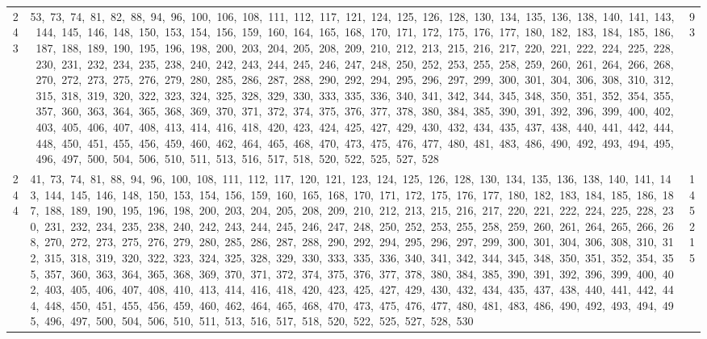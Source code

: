 \begin{longtable}{c|p{}|r}
243 & 53,\ 73,\ 74,\ 81,\ 82,\ 88,\ 94,\ 96,\ 100,\ 106,\ 108,\ 111,\ 112,\ 117,\ 121,\ 124,\ 125,\ 126,\ 128,\ 130,\ 134,\ 135,\ 136,\ 138,\ 140,\ 141,\ 143,\ 144,\ 145,\ 146,\ 148,\ 150,\ 153,\ 154,\ 156,\ 159,\ 160,\ 164,\ 165,\ 168,\ 170,\ 171,\ 172,\ 175,\ 176,\ 177,\ 180,\ 182,\ 183,\ 184,\ 185,\ 186,\ 187,\ 188,\ 189,\ 190,\ 195,\ 196,\ 198,\ 200,\ 203,\ 204,\ 205,\ 208,\ 209,\ 210,\ 212,\ 213,\ 215,\ 216,\ 217,\ 220,\ 221,\ 222,\ 224,\ 225,\ 228,\ 230,\ 231,\ 232,\ 234,\ 235,\ 238,\ 240,\ 242,\ 243,\ 244,\ 245,\ 246,\ 247,\ 248,\ 250,\ 252,\ 253,\ 255,\ 258,\ 259,\ 260,\ 261,\ 264,\ 266,\ 268,\ 270,\ 272,\ 273,\ 275,\ 276,\ 279,\ 280,\ 285,\ 286,\ 287,\ 288,\ 290,\ 292,\ 294,\ 295,\ 296,\ 297,\ 299,\ 300,\ 301,\ 304,\ 306,\ 308,\ 310,\ 312,\ 315,\ 318,\ 319,\ 320,\ 322,\ 323,\ 324,\ 325,\ 328,\ 329,\ 330,\ 333,\ 335,\ 336,\ 340,\ 341,\ 342,\ 344,\ 345,\ 348,\ 350,\ 351,\ 352,\ 354,\ 355,\ 357,\ 360,\ 363,\ 364,\ 365,\ 368,\ 369,\ 370,\ 371,\ 372,\ 374,\ 375,\ 376,\ 377,\ 378,\ 380,\ 384,\ 385,\ 390,\ 391,\ 392,\ 396,\ 399,\ 400,\ 402,\ 403,\ 405,\ 406,\ 407,\ 408,\ 413,\ 414,\ 416,\ 418,\ 420,\ 423,\ 424,\ 425,\ 427,\ 429,\ 430,\ 432,\ 434,\ 435,\ 437,\ 438,\ 440,\ 441,\ 442,\ 444,\ 448,\ 450,\ 451,\ 455,\ 456,\ 459,\ 460,\ 462,\ 464,\ 465,\ 468,\ 470,\ 473,\ 475,\ 476,\ 477,\ 480,\ 481,\ 483,\ 486,\ 490,\ 492,\ 493,\ 494,\ 495,\ 496,\ 497,\ 500,\ 504,\ 506,\ 510,\ 511,\ 513,\ 516,\ 517,\ 518,\ 520,\ 522,\ 525,\ 527,\ 528 & 93 \\
244 & 41,\ 73,\ 74,\ 81,\ 88,\ 94,\ 96,\ 100,\ 108,\ 111,\ 112,\ 117,\ 120,\ 121,\ 123,\ 124,\ 125,\ 126,\ 128,\ 130,\ 134,\ 135,\ 136,\ 138,\ 140,\ 141,\ 143,\ 144,\ 145,\ 146,\ 148,\ 150,\ 153,\ 154,\ 156,\ 159,\ 160,\ 165,\ 168,\ 170,\ 171,\ 172,\ 175,\ 176,\ 177,\ 180,\ 182,\ 183,\ 184,\ 185,\ 186,\ 187,\ 188,\ 189,\ 190,\ 195,\ 196,\ 198,\ 200,\ 203,\ 204,\ 205,\ 208,\ 209,\ 210,\ 212,\ 213,\ 215,\ 216,\ 217,\ 220,\ 221,\ 222,\ 224,\ 225,\ 228,\ 230,\ 231,\ 232,\ 234,\ 235,\ 238,\ 240,\ 242,\ 243,\ 244,\ 245,\ 246,\ 247,\ 248,\ 250,\ 252,\ 253,\ 255,\ 258,\ 259,\ 260,\ 261,\ 264,\ 265,\ 266,\ 268,\ 270,\ 272,\ 273,\ 275,\ 276,\ 279,\ 280,\ 285,\ 286,\ 287,\ 288,\ 290,\ 292,\ 294,\ 295,\ 296,\ 297,\ 299,\ 300,\ 301,\ 304,\ 306,\ 308,\ 310,\ 312,\ 315,\ 318,\ 319,\ 320,\ 322,\ 323,\ 324,\ 325,\ 328,\ 329,\ 330,\ 333,\ 335,\ 336,\ 340,\ 341,\ 342,\ 344,\ 345,\ 348,\ 350,\ 351,\ 352,\ 354,\ 355,\ 357,\ 360,\ 363,\ 364,\ 365,\ 368,\ 369,\ 370,\ 371,\ 372,\ 374,\ 375,\ 376,\ 377,\ 378,\ 380,\ 384,\ 385,\ 390,\ 391,\ 392,\ 396,\ 399,\ 400,\ 402,\ 403,\ 405,\ 406,\ 407,\ 408,\ 410,\ 413,\ 414,\ 416,\ 418,\ 420,\ 423,\ 425,\ 427,\ 429,\ 430,\ 432,\ 434,\ 435,\ 437,\ 438,\ 440,\ 441,\ 442,\ 444,\ 448,\ 450,\ 451,\ 455,\ 456,\ 459,\ 460,\ 462,\ 464,\ 465,\ 468,\ 470,\ 473,\ 475,\ 476,\ 477,\ 480,\ 481,\ 483,\ 486,\ 490,\ 492,\ 493,\ 494,\ 495,\ 496,\ 497,\ 500,\ 504,\ 506,\ 510,\ 511,\ 513,\ 516,\ 517,\ 518,\ 520,\ 522,\ 525,\ 527,\ 528,\ 530 & 145215 \\

\end{longtable}
